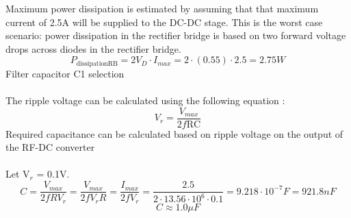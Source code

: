 \documentclass[12pt]{article}
\begin{document}
\indent
Maximum power dissipation is estimated by assuming that that maximum current of 2.5A will be supplied to the DC-DC stage. This is the worst case scenario: power dissipation in the rectifier bridge is based on two forward voltage drops across diodes in the rectifier bridge.\\
\hfill
\begin{equation}
P_{\mathrm{dissipation RB}} = 2 V_D \cdot I_{max} = 2 \cdot (0.55) \cdot 2.5 = 2.75 W
\end{equation}
Filter capacitor C1 selection\\
\hfill \\
The ripple voltage can be calculated using the following equation \cite{Microelectronics}:
\begin{equation}
V_r = \frac{V_{max}}{2f\mathrm{RC}}
\end{equation}
Required capacitance can be calculated based on ripple voltage on the output of the RF-DC converter\\
\hfill \\
Let V$_r$ = 0.1V.
\begin{equation}
C = \frac{V_{max}}{2fRV_r} = \frac{V_{max}}{2fV_rR} = \frac{I_{max}}{2fV_r} = \frac{2.5}{2 \cdot 13.56 \cdot 10^6 \cdot 0.1} = 9.218 \cdot 10^{-7}F = 921.8 nF
\end{equation}
\begin{equation}
C \approx 1.0\mu F
\end{equation}
\end{document}
